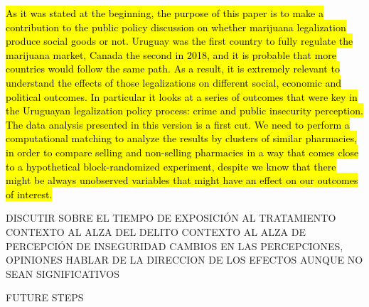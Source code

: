 \documentclass[11pt]{article}
\begin{document}
\hl{As it was stated at the beginning, the purpose of this paper is to make a contribution to the public policy discussion on whether marijuana legalization produce social goods or not. Uruguay was the first country to fully regulate the marijuana market, Canada the second in 2018, and it is probable that more countries would follow the same path. As a result, it is extremely relevant to understand the effects of those legalizations on different social, economic and political outcomes. In particular it looks at a series of outcomes that were key in the Uruguayan legalization policy process: crime and public insecurity perception. The data analysis presented in this version is a first cut. We need to perform a computational matching to analyze the results by clusters of similar pharmacies, in order to compare selling and non-selling pharmacies in a way that comes close to a hypothetical block-randomized experiment, despite we know that there might be always unobserved variables that might have an effect on our outcomes of interest.}


DISCUTIR SOBRE EL TIEMPO DE EXPOSICIÓN AL TRATAMIENTO
CONTEXTO AL ALZA DEL DELITO
CONTEXTO AL ALZA DE PERCEPCIÓN DE INSEGURIDAD
CAMBIOS EN LAS PERCEPCIONES, OPINIONES
HABLAR DE LA DIRECCION DE LOS EFECTOS AUNQUE NO SEAN SIGNIFICATIVOS

FUTURE STEPS

\printbibliography[title={8 References}]

\newpage
\appendix %
\setcounter{mycounter}{0}\textbf{}
\let\osection\section
\renewcommand{\section}{\stepcounter{mycounter}\osection}
\renewcommand\thesection{Appendix \Alph{mycounter}}
\end{document}
